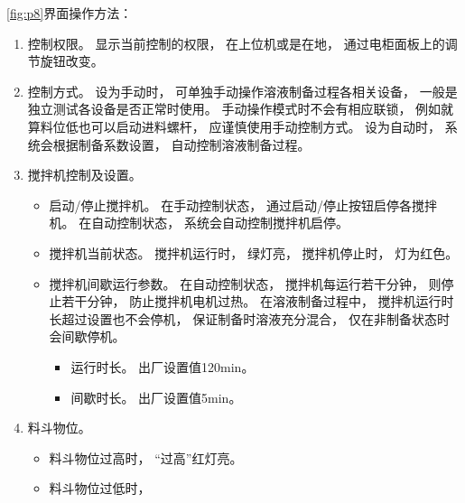       

      \newpage

      \ref{fig:p8}界面操作方法：
      \begin{enumerate}
         \item 控制权限。
            显示当前控制的权限，
            在上位机或是在地，
            通过电柜面板上的调节旋钮改变。
         \item 控制方式。
            设为手动时，
            可单独手动操作溶液制备过程各相关设备，
            一般是独立测试各设备是否正常时使用。
            手动操作模式时不会有相应联锁，
            例如就算料位低也可以启动进料螺杆，
            应谨慎使用手动控制方式。
            设为自动时，
            系统会根据制备系数设置，
            自动控制溶液制备过程。
         \item 搅拌机控制及设置。
            \begin{itemize}
               \item 启动/停止搅拌机。
                  在手动控制状态，
                  通过启动/停止按钮启停各搅拌机。
                  在自动控制状态，
                  系统会自动控制搅拌机启停。
               \item 搅拌机当前状态。
                  搅拌机运行时，
                  绿灯亮，
                  搅拌机停止时，
                  灯为红色。
               \item 搅拌机间歇运行参数。
                  在自动控制状态，
                  搅拌机每运行若干分钟，
                  则停止若干分钟，
                  防止搅拌机电机过热。
                  在溶液制备过程中，
                  搅拌机运行时长超过设置也不会停机，
                  保证制备时溶液充分混合，
                  仅在非制备状态时会间歇停机。
                  \begin{itemize}
                     \item 运行时长。
                        出厂设置值120min。
                     \item 间歇时长。
                        出厂设置值5min。
                  \end{itemize}
            \end{itemize}
         \item 料斗物位。
            \begin{itemize}
                \item 料斗物位过高时，
                    “过高”红灯亮。
                \item 料斗物位过低时，

\end{itemize}
\end{enumerate}
